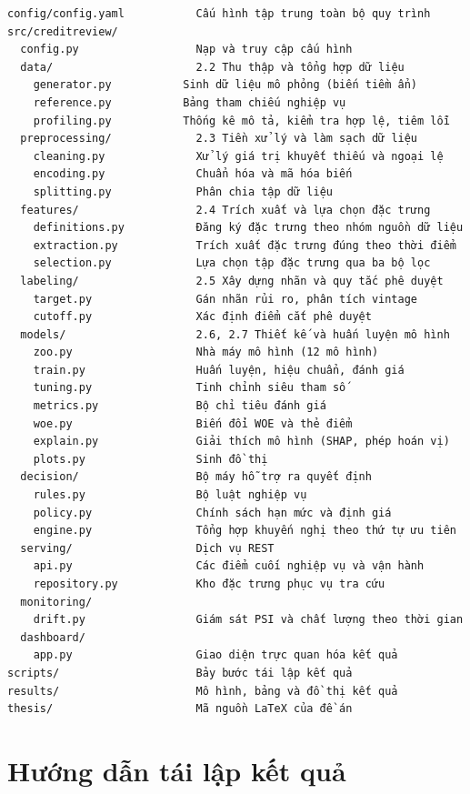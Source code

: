 \begin{verbatim}
config/config.yaml           Cấu hình tập trung toàn bộ quy trình
src/creditreview/
  config.py                  Nạp và truy cập cấu hình
  data/                      2.2 Thu thập và tổng hợp dữ liệu
    generator.py           Sinh dữ liệu mô phỏng (biến tiềm ẩn)
    reference.py           Bảng tham chiếu nghiệp vụ
    profiling.py           Thống kê mô tả, kiểm tra hợp lệ, tiêm lỗi
  preprocessing/             2.3 Tiền xử lý và làm sạch dữ liệu
    cleaning.py              Xử lý giá trị khuyết thiếu và ngoại lệ
    encoding.py              Chuẩn hóa và mã hóa biến
    splitting.py             Phân chia tập dữ liệu
  features/                  2.4 Trích xuất và lựa chọn đặc trưng
    definitions.py           Đăng ký đặc trưng theo nhóm nguồn dữ liệu
    extraction.py            Trích xuất đặc trưng đúng theo thời điểm
    selection.py             Lựa chọn tập đặc trưng qua ba bộ lọc
  labeling/                  2.5 Xây dựng nhãn và quy tắc phê duyệt
    target.py                Gán nhãn rủi ro, phân tích vintage
    cutoff.py                Xác định điểm cắt phê duyệt
  models/                    2.6, 2.7 Thiết kế và huấn luyện mô hình
    zoo.py                   Nhà máy mô hình (12 mô hình)
    train.py                 Huấn luyện, hiệu chuẩn, đánh giá
    tuning.py                Tinh chỉnh siêu tham số
    metrics.py               Bộ chỉ tiêu đánh giá
    woe.py                   Biến đổi WOE và thẻ điểm
    explain.py               Giải thích mô hình (SHAP, phép hoán vị)
    plots.py                 Sinh đồ thị
  decision/                  Bộ máy hỗ trợ ra quyết định
    rules.py                 Bộ luật nghiệp vụ
    policy.py                Chính sách hạn mức và định giá
    engine.py                Tổng hợp khuyến nghị theo thứ tự ưu tiên
  serving/                   Dịch vụ REST
    api.py                   Các điểm cuối nghiệp vụ và vận hành
    repository.py            Kho đặc trưng phục vụ tra cứu
  monitoring/
    drift.py                 Giám sát PSI và chất lượng theo thời gian
  dashboard/
    app.py                   Giao diện trực quan hóa kết quả
scripts/                     Bảy bước tái lập kết quả
results/                     Mô hình, bảng và đồ thị kết quả
thesis/                      Mã nguồn LaTeX của đề án
\end{verbatim}

\section{Hướng dẫn tái lập kết quả}

